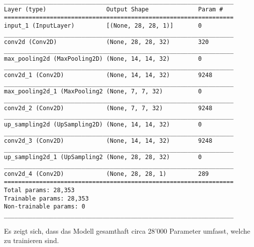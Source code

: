 \begin{verbatim}
_________________________________________________________________
Layer (type)                 Output Shape              Param #
=================================================================
input_1 (InputLayer)         [(None, 28, 28, 1)]       0
_________________________________________________________________
conv2d (Conv2D)              (None, 28, 28, 32)        320
_________________________________________________________________
max_pooling2d (MaxPooling2D) (None, 14, 14, 32)        0
_________________________________________________________________
conv2d_1 (Conv2D)            (None, 14, 14, 32)        9248
_________________________________________________________________
max_pooling2d_1 (MaxPooling2 (None, 7, 7, 32)          0
_________________________________________________________________
conv2d_2 (Conv2D)            (None, 7, 7, 32)          9248
_________________________________________________________________
up_sampling2d (UpSampling2D) (None, 14, 14, 32)        0
_________________________________________________________________
conv2d_3 (Conv2D)            (None, 14, 14, 32)        9248
_________________________________________________________________
up_sampling2d_1 (UpSampling2 (None, 28, 28, 32)        0
_________________________________________________________________
conv2d_4 (Conv2D)            (None, 28, 28, 1)         289
=================================================================
Total params: 28,353
Trainable params: 28,353
Non-trainable params: 0
_________________________________________________________________
\end{verbatim}
Es zeigt sich, dass das Modell gesamthaft circa 28'000 Parameter umfasst,
welche zu trainieren sind.

